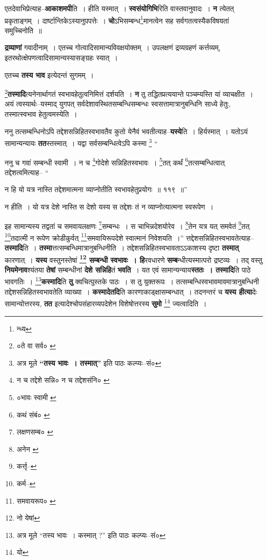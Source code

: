 \documentclass[article,12pt,a4paper]{memoir}
\begin{document}
	  \pstart एतदेवाभिप्रेत्याह--\textbf{आकाशमपी}ति । हीति यस्मात् । \textbf{स्वसंयोगिभि}रिति वास्तवानुवादः । \textbf{न} त्येतत् प्रकृताङ्गम् । दार्ष्टान्तिकेऽस्यानुपपत्तेः । \textbf{चो}ऽभिसम्बन्ध\footnote{न्ध्य}मानत्वेन सह सर्वगतत्वस्यैकविषयतां समुच्चिनोति ॥
	\pend
      

	  \pstart \textbf{द्रव्याणां} गवादीनाम् । एतच्च गोत्वादिसामान्यविवक्षयोक्तम् । उपलक्षणं द्रव्यग्रहणं कर्त्तव्यम्, इतरथोत्क्षेपणत्वादिसामान्यस्यासङ्ग्रहः स्यात् ।
	\pend
      

	  \pstart एतच्च \textbf{तस्य भाव} इत्येदन्तं सुगमम् ।
	\pend
      

	  \pstart \footnote{०ते वा सर्व० \cite{dp-msB}}\textbf{तस्मादि}त्यनेनार्थागतं स्वभावहेतुत्वनिमित्तं दर्शयति । \textbf{न} तु तद्धितप्रत्ययान्ते पञ्चम्यस्ति यां व्याचक्षीत । अयं त्वस्यार्थः--यस्माद् युगपत् सर्वदेशावस्थितसम्बन्धिसम्बन्धः स्वसत्तामात्रानुबन्धिनि साध्ये हेतुः, तस्मात्स्वभाव हेतुत्वमस्येति ।
	\pend
      

	  \pstart ननु तत्सम्बन्धिनोऽपि तद्देशसन्निहितस्वभावतैव कुतो येनैवं भवतीत्याह--\textbf{यस्ये}ति । हिर्यस्मात् । यतोऽयं सामान्यन्यायः \textbf{तत}स्त\leavevmode{}स्मात् । यद्वा सर्वसम्बन्धित्वेऽपि कस्मा  \footnote{अत्र मूले \textbf{“तस्य भावः । तस्मात्”} इति पाठः कल्प्यः--सं०} \leavevmode{} “
	  
	ननु च गवां सम्बन्धी स्वामी । न च \footnote{न च तद्देशे सन्नि० \cite{dp-msA} \cite{dp-msB} \cite{dp-edP} \cite{dp-edH} \cite{dp-edE} न च तद्देशसंनि० \cite{dp-edN}}गोदेशे सन्निहितस्वभावः । \footnote{०भावः स्वामी \cite{dp-msA} \cite{dp-msB} \cite{dp-edP} \cite{dp-edH} \cite{dp-edE} \cite{dp-edN}}तत् कर्थं \footnote{कथं संबं० \cite{dp-msA} \cite{dp-msB} \cite{dp-msC} \cite{dp-msD} \cite{dp-edP} \cite{dp-edH} \cite{dp-edN}}तत्सम्बन्धित्वात् तद्देशत्वमित्याह-- “
	  
	न हि यो यत्र नास्ति तद्देशमात्मना व्याप्नोतीति स्वभावहेतुप्रयोगः ॥ ११९ ॥” 
	  
	न हीति । यो यत्र देशे नास्ति स देशो यस्य स तद्देशः तं न व्याप्नोत्यात्मना स्वरूपेण । 
	  
	इह सामान्यस्य तद्वतां च समवायलक्षणः \footnote{लक्षणसम्ब० \cite{dp-msA}}सम्बन्धः । स चाभिन्नदेशयोरेव । \footnote{अनेन \cite{dp-msB}}तेन यत्र यत् समवेतं \footnote{कर्त्तृ--\cite{dp-msD-n}}तत् \footnote{कर्म--\cite{dp-msD-n}}तदात्मी न रूपेण क्रोडीकुर्वत् \footnote{समवायरूप० \cite{dp-msC}}समवायिरूपदेशे स्वात्मानं निवेशयति ।” त्तद्देशसन्निहितस्वभावतेत्याह--\textbf{तस्मादि}ति । \textbf{तस्मा}त्तत्सम्बन्धिमात्रानुबन्धिनीति । तद्देशसन्निहितस्वभावताऽऽकाशस्य दृष्टा \textbf{तस्मात्} कारणात् । \textbf{यस्य} वस्तुनस्तेषां \textbf{\footnote{नो येषां} सम्बन्धी स्वभावः । हि}रवधारणे \textbf{सम्ब}न्धीत्यस्मात्परो द्रष्टव्यः । तद् वस्तु \textbf{नियमेनाव}श्यंतया \textbf{तेषां} सम्बन्धीनां \textbf{देशे सन्निहि}तं \textbf{भवति} । यत एवं सामान्यन्याय\textbf{स्ततः । तस्मादि}ति पाठे भावगतिः । \footnote{अत्र मूले “तस्य भावः । कस्मात् ?” इति पाठः कल्प्यः--सं०}\textbf{कस्मादि}ति \textbf{तु} क्वचित्पुस्तके पाठः । स तु युक्तरूपः । तत्सम्बन्धिस्वभावमावमात्रानुबन्धिनी तद्देशसन्निहितस्वभावतेति व्याख्या । \textbf{कस्मादेतदि}ति कारणाकाड्क्षासम्बन्धात् । तदनन्तरं च \textbf{यस्य हीत्या}देः सामान्योत्तरस्य, \textbf{तत} इत्यादेश्चोपसंहारव्यपदेशेन विशेषोत्तरस्य \textbf{सुमो} \footnote{यो} ज्यत्वादिति ।
	\pend
      
\end{document}
